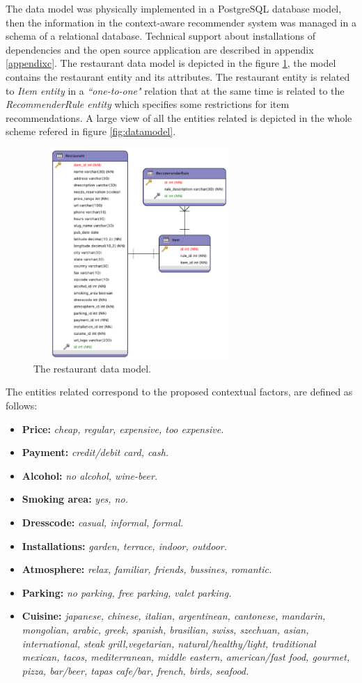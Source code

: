 The data model was physically implemented in a PostgreSQL database model, 
then the information in the context-aware recommender system was
managed in a schema of a relational database. Technical support 
about installations of dependencies and the open source application are 
described in appendix \ref{appendixc}.
The restaurant data model is depicted in the figure
\ref{fig:restaurantmodeldata}, the model contains the restaurant
entity and its attributes. The restaurant entity is related to
\textit{Item entity} in a \textit{``one-to-one"} relation that at the
same time is related to the \textit{RecommenderRule entity} which
specifies some restrictions for item recommendations. A large view of
all the entities related is depicted in the whole scheme refered in
figure \ref{fig:datamodel}.
\begin{figure}
\captionsetup{justification=centering,margin=2cm,font=footnotesize}
\centering
\includegraphics[width=8cm,height=8cm,keepaspectratio]{img/data-resmodel.png}
\caption{The restaurant data model.}
\label{fig:restaurantmodeldata}     
\end{figure}
The entities related correspond to the proposed contextual factors, 
are defined as follows: 
\begin{itemize}
\item \textbf{Price:} \textit{cheap, regular, expensive, too expensive.}
\item \textbf{Payment:} \textit{credit/debit card, cash.}
\item \textbf{Alcohol:} \textit{no alcohol, wine-beer.}
\item \textbf{Smoking area:} \textit{yes, no.}
\item \textbf{Dresscode:} \textit{casual, informal, formal.}
\item \textbf{Installations:} \textit{garden, terrace, indoor, outdoor.}
\item \textbf{Atmosphere:} \textit{relax, familiar, friends, bussines, romantic.}
\item \textbf{Parking:} \textit{no parking, free parking, valet parking.}
\item \textbf{Cuisine:} \textit{japanese, chinese, italian, argentinean,
cantonese, mandarin, mongolian, arabic, greek, spanish, brasilian,
swiss, szechuan, asian, international, steak grill,vegetarian,
natural/healthy/light, traditional mexican, tacos, mediterranean,
middle eastern, american/fast food, gourmet, pizza, bar/beer, tapas
cafe/bar, french, birds, seafood.}
\end{itemize}
